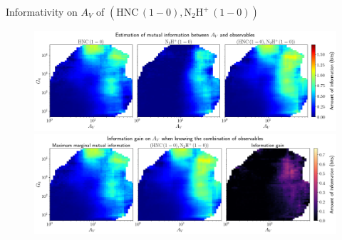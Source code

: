 \documentclass{beamer}
\begin{document}
\begin{frame}{Informativity on $A_V$ of $\left(\mathrm{HNC\,(1-0)},\mathrm{N_2H^+\,(1-0)}\right)$}
    \begin{figure}
        \centering
        \includegraphics[width=0.95\linewidth]{../mi/av__hnc10_n2hp10_mi.png}
        \vfill
        \includegraphics[width=0.95\linewidth]{../mi/av__hnc10_n2hp10_mi_gain.png}
    \end{figure}
\end{frame}
\end{document}
